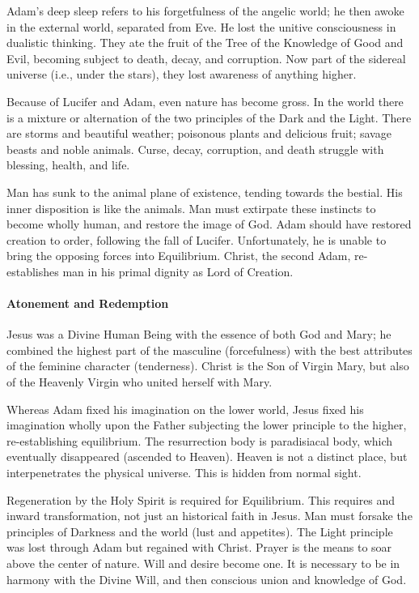 Adam's deep sleep refers to his forgetfulness of the angelic world; he then awoke in the external world, separated from Eve. He lost the unitive consciousness in dualistic thinking. They ate the fruit of the Tree of the Knowledge of Good and Evil, becoming subject to death, decay, and corruption. Now part of the sidereal universe (i.e., under the stars), they lost awareness of anything higher.

Because of Lucifer and Adam, even nature has become gross. In the world there is a mixture or alternation of the two principles of the Dark and the Light. There are storms and beautiful weather; poisonous plants and delicious fruit; savage beasts and noble animals. Curse, decay, corruption, and death struggle with blessing, health, and life.

Man has sunk to the animal plane of existence, tending towards the bestial. His inner disposition is like the animals. Man must extirpate these instincts to become wholly human, and restore the image of God. Adam should have restored creation to order, following the fall of Lucifer. Unfortunately, he is unable to bring the opposing forces into Equilibrium. Christ, the second Adam, re-establishes man in his primal dignity as Lord of Creation.

\paragraph{Atonement and Redemption}
Jesus was a Divine Human Being with the essence of both God and Mary; he combined the highest part of the masculine (forcefulness) with the best attributes of the feminine character (tenderness). Christ is the Son of Virgin Mary, but also of the Heavenly Virgin who united herself with Mary.

Whereas Adam fixed his imagination on the lower world, Jesus fixed his imagination wholly upon the Father subjecting the lower principle to the higher, re-establishing equilibrium. The resurrection body is paradisiacal body, which eventually disappeared (ascended to Heaven). Heaven is not a distinct place, but interpenetrates the physical universe. This is hidden from normal sight.

Regeneration by the Holy Spirit is required for Equilibrium. This requires and inward transformation, not just an historical faith in Jesus. Man must forsake the principles of Darkness and the world (lust and appetites). The Light principle was lost through Adam but regained with Christ. Prayer is the means to soar above the center of nature. Will and desire become one. It is necessary to be in harmony with the Divine Will, and then conscious union and knowledge of God.

